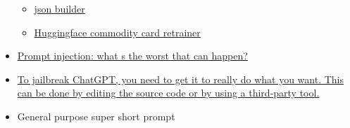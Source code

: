 \begin{itemize}
\begin{itemize}
  \item
    \href{https://oobabooga.github.io/character-creator.html}{json
    builder}
  \item
    \href{https://huggingface.co/blog/trl-peft}{Huggingface commodity
    card retrainer}
  \end{itemize}
\item
  \href{https://simonwillison.net/2023/Apr/14/worst-that-can-happen/}{Prompt
  injection: what s the worst that can happen?}
\item
  \href{https://www.digitaltrends.com/computing/how-to-jailbreak-chatgpt/}{To
  jailbreak ChatGPT, you need to get it to really do what you want. This
  can be done by editing the source code or by using a third-party
  tool.}
\item
  General purpose super short prompt

  \begin{itemize}
   

\end{itemize}
\end{itemize}
